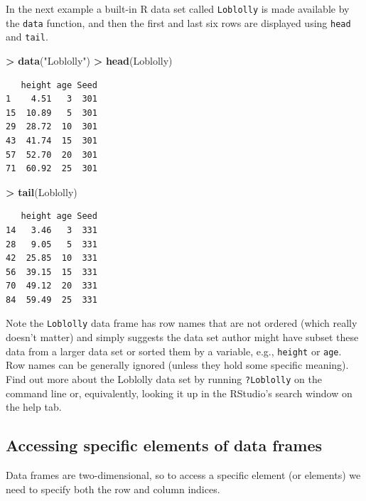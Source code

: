 \documentclass[]{krantz}
\makeatletter
\newenvironment{Shaded}{\begin{snugshade}}{\end{snugshade}}
\newcommand{\KeywordTok}[1]{\textcolor[rgb]{0.27,0.27,0.27}{\textbf{#1}}}
\newcommand{\StringTok}[1]{\textcolor[rgb]{0.5,0.5,0.5}{#1}}
\newcommand{\OperatorTok}[1]{\textcolor[rgb]{0.43,0.43,0.43}{\textbf{#1}}}
\newcommand{\NormalTok}[1]{#1}
\newenvironment{kframe}{%
\medskip{}
\setlength{\fboxsep}{.8em}
 \def\at@end@of@kframe{}%
 \ifinner\ifhmode%
  \def\at@end@of@kframe{\end{minipage}}%
  \begin{minipage}{\columnwidth}%
 \fi\fi%
 \def\FrameCommand##1{\hskip\@totalleftmargin \hskip-\fboxsep
 \colorbox{shadecolor}{##1}\hskip-\fboxsep
     \hskip-\linewidth \hskip-\@totalleftmargin \hskip\columnwidth}%
 \MakeFramed {\advance\hsize-\width
   \@totalleftmargin\z@ \linewidth\hsize
   \@setminipage}}%
 {\par\unskip\endMakeFramed%
 \at@end@of@kframe}
\renewenvironment{Shaded}{\begin{kframe}}{\end{kframe}}
\theoremstyle{definition}
\theoremstyle{definition}
\theoremstyle{definition}
\theoremstyle{remark}
\makeatother
\begin{document}
In the next example a built-in R data set called \texttt{Loblolly} is
made available by the \texttt{data} function, and then the first and
last six rows are displayed using \texttt{head} and \texttt{tail}.

\begin{Shaded}
\begin{Highlighting}[]
\OperatorTok{>}\StringTok{ }\KeywordTok{data}\NormalTok{(}\StringTok{"Loblolly"}\NormalTok{)}
\OperatorTok{>}\StringTok{ }\KeywordTok{head}\NormalTok{(Loblolly)}
\end{Highlighting}
\end{Shaded}

\begin{verbatim}
   height age Seed
1    4.51   3  301
15  10.89   5  301
29  28.72  10  301
43  41.74  15  301
57  52.70  20  301
71  60.92  25  301
\end{verbatim}

\begin{Shaded}
\begin{Highlighting}[]
\OperatorTok{>}\StringTok{ }\KeywordTok{tail}\NormalTok{(Loblolly)}
\end{Highlighting}
\end{Shaded}

\begin{verbatim}
   height age Seed
14   3.46   3  331
28   9.05   5  331
42  25.85  10  331
56  39.15  15  331
70  49.12  20  331
84  59.49  25  331
\end{verbatim}

Note the \texttt{Loblolly} data frame has row names that are not ordered
(which really doesn't matter) and simply suggests the data set author
might have subset these data from a larger data set or sorted them by a
variable, e.g., \texttt{height} or \texttt{age}. Row names can be
generally ignored (unless they hold some specific meaning). Find out
more about the Loblolly data set by running \texttt{?Loblolly} on the
command line or, equivalently, looking it up in the RStudio's search
window on the help tab.

\subsection{Accessing specific elements of data
frames}\label{accessing-specific-elements-of-data-frames}

Data frames are two-dimensional, so to access a specific element (or
elements) we need to specify both the row and column indices.
\end{document}
